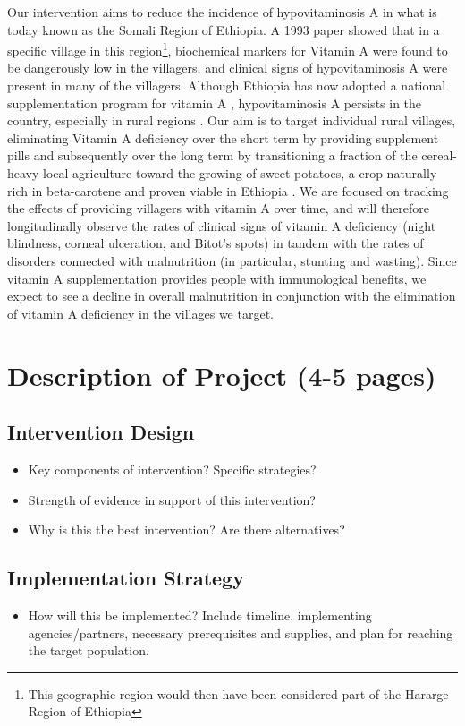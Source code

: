 \documentclass[12pt, letterpaper, draft]{article}
\begin{document}
Our intervention aims to reduce the incidence of hypovitaminosis A in what is today known as the Somali Region of Ethiopia. A 1993 paper \cite{wolde1993severe} showed that in a specific village in this region\footnote{This geographic region would then have been considered part of the Hararge Region of Ethiopia}, biochemical markers for Vitamin A were found to be dangerously low in the villagers, and clinical signs of hypovitaminosis A were present in many of the villagers. Although Ethiopia has now adopted a national supplementation program for vitamin A \cite{semba2008coverage}, hypovitaminosis A persists in the country, especially in rural regions \cite{demissie2010magnitude}. Our aim is to target individual rural villages, eliminating Vitamin A deficiency over the short term by providing supplement pills and subsequently over the long term by transitioning a fraction of the cereal-heavy local agriculture toward the growing of sweet potatoes, a crop naturally rich in beta-carotene and proven viable in Ethiopia \cite{belehu2003agronomical}. We are focused on tracking the effects of providing villagers with vitamin A over time, and will therefore longitudinally observe the rates of clinical signs of vitamin A deficiency (night blindness, corneal ulceration, and Bitot's spots) in tandem with the rates of disorders connected with malnutrition (in particular, stunting and wasting). Since vitamin A supplementation provides people with immunological benefits, we expect to see a decline in overall malnutrition in conjunction with the elimination of vitamin A deficiency in the villages we target.

\section{Description of Project (4-5 pages)}
\subsection{Intervention Design}
\begin{itemize}
    \item Key components of intervention? Specific strategies?
    \item Strength of evidence in support of this intervention?
    \item Why is this the best intervention? Are there alternatives?
\end{itemize}
\subsection{Implementation Strategy}
\begin{itemize}
    \item How will this be implemented? Include timeline, implementing agencies/partners,
    necessary prerequisites and supplies, and plan for reaching the target population.
\end{itemize}
\end{document}
